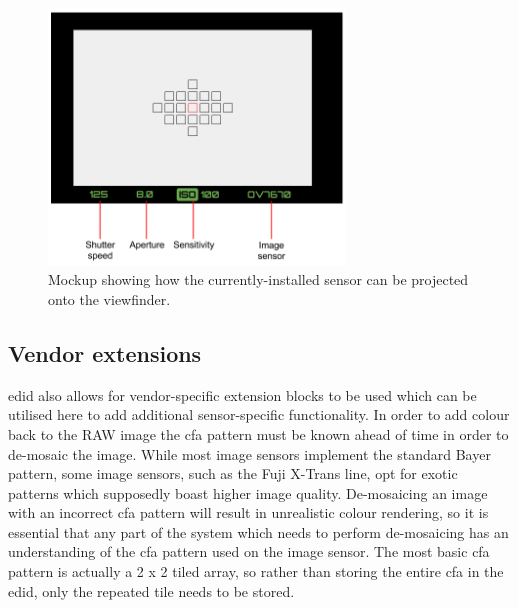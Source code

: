 \begin{figure}
  \centering
  \includegraphics[width=0.7\textwidth]{./img/viewfinder.png}
  \caption{Mockup showing how the currently-installed sensor can be projected onto the viewfinder.}
  \label{fig:viewfinder}
\end{figure}

\subsection{Vendor extensions}
\gls{edid} also allows for vendor-specific extension blocks to be used which can be utilised here to add additional sensor-specific functionality. In order to add colour back to the RAW image the \gls{cfa} pattern must be known ahead of time in order to de-mosaic the image. While most image sensors implement the standard Bayer pattern, some image sensors, such as the Fuji X-Trans line, opt for exotic patterns which supposedly boast higher image quality. De-mosaicing an image with an incorrect \gls{cfa} pattern will result in unrealistic colour rendering, so it is essential that any part of the system which needs to perform de-mosaicing has an understanding of the \gls{cfa} pattern used on the image sensor. The most basic \gls{cfa} pattern is actually a 2 x 2 tiled array, so rather than storing the entire \gls{cfa} in the \gls{edid}, only the repeated tile needs to be stored.